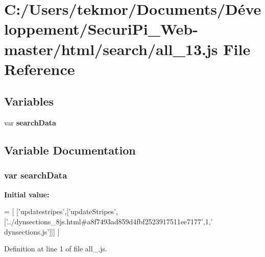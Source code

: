 \section{C\+:/\+Users/tekmor/\+Documents/\+Développement/\+Securi\+Pi\+\_\+\+Web-\/master/html/search/all\+\_\+13.js File Reference}
\label{all__13_8js}
\subsection*{Variables}
\begin{DoxyCompactItemize}
\item 
var {\bf search\+Data}
\end{DoxyCompactItemize}


\subsection{Variable Documentation}
\subsubsection[{search\+Data}]{\setlength{\rightskip}{0pt plus 5cm}var search\+Data}\label{all__13_8js_ad01a7523f103d6242ef9b0451861231e}
{\bfseries Initial value\+:}
\begin{DoxyCode}
=
[
  [\textcolor{stringliteral}{'updatestripes'},[\textcolor{stringliteral}{'updateStripes'},[\textcolor{stringliteral}{'../dynsections\_8js.html#a8f7493ad859d4fbf2523917511ee7177'},1,\textcolor{stringliteral}{'
      dynsections.js'}]]]
]
\end{DoxyCode}


Definition at line 1 of file all\+\_.\+js.

